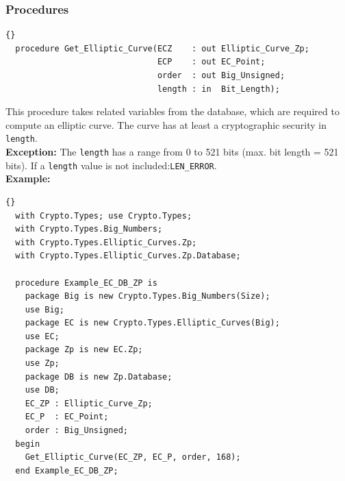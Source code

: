 \subsubsection*{Procedures}
\begin{lstlisting}{}
  procedure Get_Elliptic_Curve(ECZ    : out Elliptic_Curve_Zp;
                               ECP    : out EC_Point;
                               order  : out Big_Unsigned;
                               length : in  Bit_Length);
\end{lstlisting}
This procedure takes related variables from the database, which are
required to compute an elliptic curve. The curve has at least a
cryptographic security in \texttt{length}. \\

\noindent\textbf{Exception:} The
\texttt{length} has a range from 0 to 521 bits (max. bit length = 521
bits). If a \texttt{length} value is not
included:\quad\texttt{LEN\_ERROR}.\\

\noindent\textbf{Example:}
\begin{lstlisting}{}
  with Crypto.Types; use Crypto.Types;
  with Crypto.Types.Big_Numbers;
  with Crypto.Types.Elliptic_Curves.Zp;
  with Crypto.Types.Elliptic_Curves.Zp.Database;

  procedure Example_EC_DB_ZP is
    package Big is new Crypto.Types.Big_Numbers(Size);
    use Big;
    package EC is new Crypto.Types.Elliptic_Curves(Big);
    use EC;
    package Zp is new EC.Zp;
    use Zp;
    package DB is new Zp.Database;
    use DB;
    EC_ZP : Elliptic_Curve_Zp;
    EC_P  : EC_Point;
    order : Big_Unsigned;
  begin
    Get_Elliptic_Curve(EC_ZP, EC_P, order, 168);
  end Example_EC_DB_ZP;
\end{lstlisting}
